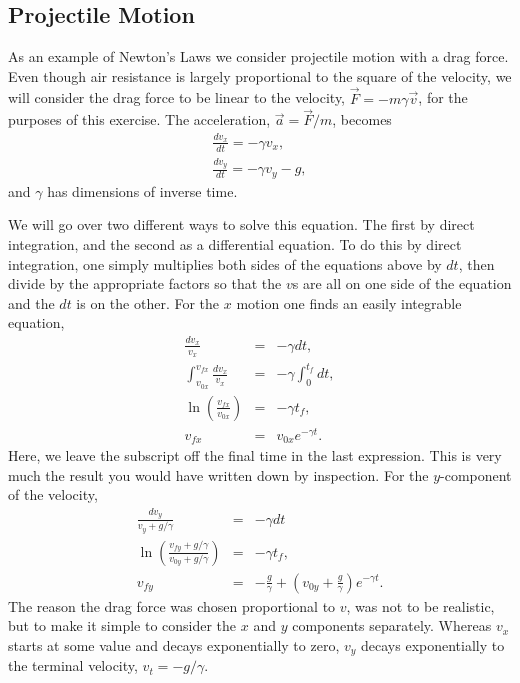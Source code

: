 \subsection{Projectile Motion}
\label{sec:projectile}

As an example of Newton's Laws we consider projectile motion with a drag force. Even though air resistance is largely proportional to the square of the velocity, we will consider the drag force to be linear to the velocity, $\vec{F}=-m\gamma\vec{v}$, for the purposes of this exercise. The acceleration, $\vec{a}=\vec{F}/m$, becomes
\begin{eqnarray}
\frac{dv_x}{dt}=-\gamma v_x,\\
\nonumber
\frac{dv_y}{dt}=-\gamma v_y-g,
\end{eqnarray}
and $\gamma$ has dimensions of inverse time.

We will go over two different ways to solve this equation. The first by direct integration, and the second as a differential equation. To do this by direct integration, one simply multiplies both sides of the equations above by $dt$, then divide by the appropriate factors so that the $v$s are all on one side of the equation and the $dt$ is on the other. For the $x$ motion one finds an easily integrable equation,
\begin{eqnarray}
\frac{dv_x}{v_x}&=&-\gamma dt,\\
\nonumber
\int_{v_{0x}}^{v_{fx}}\frac{dv_x}{v_x}&=&-\gamma\int_0^{t_f}dt,\\
\nonumber
\ln\left(\frac{v_{fx}}{v_{0x}}\right)&=&-\gamma t_f,\\
\nonumber
v_{fx}&=&v_{0x}e^{-\gamma t}.
\end{eqnarray}
Here, we leave the subscript off the final time in the last expression. This is very much the result you would have written down by inspection. For the $y$-component of the velocity,
\begin{eqnarray}
\frac{dv_y}{v_y+g/\gamma}&=&-\gamma dt\\
\nonumber
\ln\left(\frac{v_{fy}+g/\gamma}{v_{0y}+g/\gamma}\right)&=&-\gamma t_f,\\
\nonumber
v_{fy}&=&-\frac{g}{\gamma}+\left(v_{0y}+\frac{g}{\gamma}\right)e^{-\gamma t}.
\end{eqnarray}
The reason the drag force was chosen proportional to $v$, was not to be realistic, but to make it simple to consider the $x$ and $y$ components separately. Whereas $v_x$ starts at some value and decays exponentially to zero, $v_y$ decays exponentially to the terminal velocity, $v_t=-g/\gamma$.

